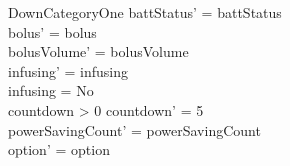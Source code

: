 \begin{schema}{DownCategoryOne}
	battStatus' = battStatus\\
	bolus' = bolus\\
	bolusVolume' = bolusVolume\\
	infusing' = infusing\\
	infusing = No\\
	countdown > 0 \land countdown' = 5\\
	powerSavingCount' = powerSavingCount\\ option' = option\\
\end{schema}

